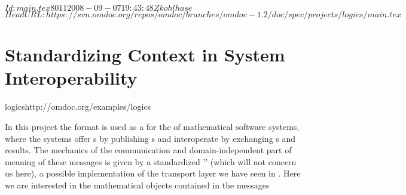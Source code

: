\svnInfo $Id: main.tex 8011 2008-09-07 19:43:48Z kohlhase $
\svnKeyword $HeadURL: https://svn.omdoc.org/repos/omdoc/branches/omdoc-1.2/doc/spec/projects/logics/main.tex $

\section{Standardizing Context in System Interoperability}
\begin{project}{logics}{http://omdoc.org/examples/logics}
\end{project}

In this project the {\omdoc} format is used as a {} for the
{} of mathematical software systems, where the
systems offer {s} by publishing
{s} and interoperate by exchanging
{s} and results. The mechanics of the communication and
domain-independent part of meaning of these messages is given by a standardized
'{}' (which will not concern us here), a possible implementation of
the transport layer we have seen in {}. Here we are interested in the
mathematical objects contained in the messages

